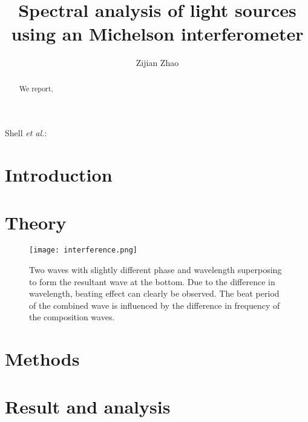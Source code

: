 \documentclass[journal]{Imperial_lab_report}
\begin{document}
\title{Spectral analysis of light sources using an Michelson interferometer}

\author{Zijian Zhao}%

%
{Shell \MakeLowercase{\textit{et al.}}:}

\maketitle


\begin{abstract}

We report, 
\end{abstract}


\section{Introduction}



\section{Theory}
\label{theory}

\begin{figure}[]
\centering
\texttt{[image: interference.png]}
\caption{Two waves with slightly different phase and wavelength superposing to form the resultant wave at the bottom. Due to the difference in wavelength, beating effect can clearly be observed. The beat period of the combined wave is influenced by the difference in frequency of the composition waves.}
\label{fig:interference}
\end{figure}

\section{Methods}
\label{methods}

\section{Result and analysis}
\label{analysis}
\end{document}
